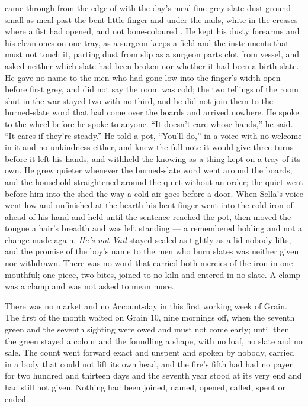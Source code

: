  came through from the edge of  with the day's meal-fine grey slate dust ground small as meal past the bent little finger and under the nails, white in the creases where a fist had opened, and not bone-coloured . He kept his dusty forearms and his clean ones on one tray, as a surgeon keeps a field and the instruments that must not touch it, parting dust from slip as a surgeon parts clot from vessel, and asked neither which slate had been broken nor whether it had been a birth-slate. He gave no name to the men who had gone low into the finger's-width-open  before first grey, and did not say the room was cold; the two tellings of the room shut in the war stayed two with no third, and he did not join them to the burned-slate word that had come over the boards and arrived nowhere. He spoke to the wheel before he spoke to anyone. “It doesn't care whose hands,” he said. “It cares if they're steady.” He told a pot, “You'll do,” in a voice with no welcome in it and no unkindness either, and knew the full note it would give three turns before it left his hands, and withheld the knowing as a thing kept on a tray of its own. He grew quieter whenever the burned-slate word went around the boards, and the household straightened around the quiet without an order; the quiet went before him into the shed the way a cold air goes before a door. When Sella's voice went low and unfinished at the hearth his bent finger went into the cold iron of  ahead of his hand and held until the sentence reached the pot, then moved the tongue a hair's breadth and was left standing --- a remembered holding and not a change made again. \emph{He's not Vail} stayed sealed as tightly as a lid nobody lifts, and the promise of the boy's name to the men who burn slates was neither given nor withdrawn. There was no  word that carried both mercies of the iron in one mouthful; one piece, two bites, joined to no kiln and entered in no slate. A clamp was a clamp and was not asked to mean more.

\scenebreak

There was no market and no Account-day in this first working week of Grain. The first of the month waited on Grain 10, nine mornings off, when the seventh green and the seventh sighting were owed and must not come early; until then the green stayed a colour and the foundling a shape, with no loaf, no slate and no sale. The count went forward exact and unspent and spoken by nobody, carried in a body that could not lift its own head, and the fire's fifth had had no payer for two hundred and thirteen days and the seventh year stood at its very end and had still not given. Nothing had been joined, named, opened, called, spent or ended.

